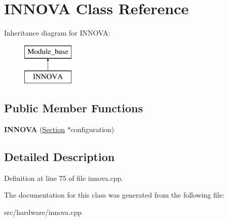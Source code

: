 \hypertarget{classINNOVA}{\section{I\-N\-N\-O\-V\-A Class Reference}
\label{classINNOVA}
}
Inheritance diagram for I\-N\-N\-O\-V\-A\-:\begin{figure}[H]
\begin{center}
\leavevmode
\includegraphics[height=2.000000cm]{classINNOVA}
\end{center}
\end{figure}
\subsection*{Public Member Functions}
\begin{DoxyCompactItemize}
\item 
\hypertarget{classINNOVA_a9ce1407a469660a8e791653bec22ad29}{{\bfseries I\-N\-N\-O\-V\-A} (\hyperlink{classSection}{Section} $\ast$configuration)}\label{classINNOVA_a9ce1407a469660a8e791653bec22ad29}

\end{DoxyCompactItemize}


\subsection{Detailed Description}


Definition at line 75 of file innova.\-cpp.



The documentation for this class was generated from the following file\-:\begin{DoxyCompactItemize}
\item 
src/hardware/innova.\-cpp\end{DoxyCompactItemize}
